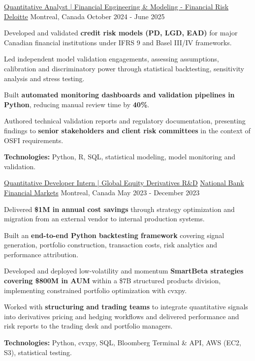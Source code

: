 \begin{cventries}
  \cventry
    {\href{https://www.deloitte.com/ca/en.html}{Quantitative Analyst | Financial Engineering \& Modeling - Financial Risk}}
    {\href{https://www.deloitte.com/ca/en.html}{Deloitte}}
    {Montreal, Canada}
    {October 2024 - June 2025}
    {
      \begin{cvitems}
        \item{Developed and validated \textbf{credit risk models (PD, LGD, EAD)} for major Canadian financial institutions under IFRS 9 and Basel III/IV frameworks.}
        \item{Led independent model validation engagements, assessing assumptions, calibration and discriminatory power through statistical backtesting, sensitivity analysis and stress testing.}
        \item{Built \textbf{automated monitoring dashboards and validation pipelines in Python}, reducing manual review time by \textbf{40\%}.}
        \item{Authored technical validation reports and regulatory documentation, presenting findings to \textbf{senior stakeholders and client risk committees} in the context of OSFI requirements.}
        \item{\textbf{Technologies:} Python, R, SQL, statistical modeling, model monitoring and validation.}
      \end{cvitems}
    }

  \cventry
    {\href{https://www.nbc.ca/en/capitalmarkets.html}{Quantitative Developer Intern | Global Equity Derivatives R\&D}}
    {\href{https://www.nbc.ca/en/capitalmarkets.html}{National Bank Financial Markets}}
    {Montreal, Canada}
    {May 2023 - December 2023}
    {
      \begin{cvitems}
        \item{Delivered \textbf{\$1M in annual cost savings} through strategy optimization and migration from an external vendor to internal production systems.}
        \item{Built an \textbf{end-to-end Python backtesting framework} covering signal generation, portfolio construction, transaction costs, risk analytics and performance attribution.}
        \item{Developed and deployed low-volatility and momentum \textbf{SmartBeta strategies covering \$800M in AUM} within a \$7B structured products division, implementing constrained portfolio optimization with cvxpy.}
        \item{Worked with \textbf{structuring and trading teams} to integrate quantitative signals into derivatives pricing and hedging workflows and delivered performance and risk reports to the trading desk and portfolio managers.}
        \item{\textbf{Technologies:} Python, cvxpy, SQL, Bloomberg Terminal \& API, AWS (EC2, S3), statistical testing.}
      \end{cvitems}
    }


\end{cventries}
